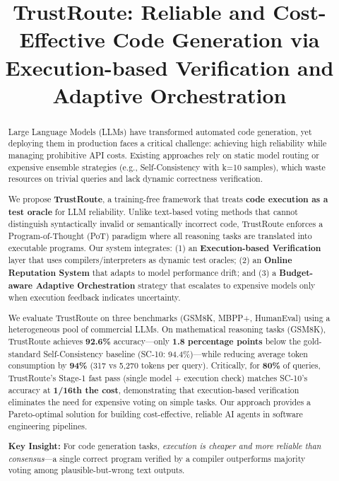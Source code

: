 \documentclass[acmsmall,screen,review,anonymous]{acmart}
\begin{document}
\title{TrustRoute: Reliable and Cost-Effective Code Generation via Execution-based Verification and Adaptive Orchestration}

\begin{abstract}
Large Language Models (LLMs) have transformed automated code generation, yet deploying them in production faces a critical challenge: achieving high reliability while managing prohibitive API costs. Existing approaches rely on static model routing or expensive ensemble strategies (e.g., Self-Consistency with k=10 samples), which waste resources on trivial queries and lack dynamic correctness verification.

We propose \textbf{TrustRoute}, a training-free framework that treats \textbf{code execution as a test oracle} for LLM reliability. Unlike text-based voting methods that cannot distinguish syntactically invalid or semantically incorrect code, TrustRoute enforces a Program-of-Thought (PoT) paradigm where all reasoning tasks are translated into executable programs. Our system integrates: (1) an \textbf{Execution-based Verification} layer that uses compilers/interpreters as dynamic test oracles; (2) an \textbf{Online Reputation System} that adapts to model performance drift; and (3) a \textbf{Budget-aware Adaptive Orchestration} strategy that escalates to expensive models only when execution feedback indicates uncertainty.

We evaluate TrustRoute on three benchmarks (GSM8K, MBPP+, HumanEval) using a heterogeneous pool of commercial LLMs. On mathematical reasoning tasks (GSM8K), TrustRoute achieves \textbf{92.6\%} accuracy—only \textbf{1.8 percentage points} below the gold-standard Self-Consistency baseline (SC-10: 94.4\%)—while reducing average token consumption by \textbf{94\%} (317 vs 5,270 tokens per query). Critically, for \textbf{80\%} of queries, TrustRoute's Stage-1 fast pass (single model + execution check) matches SC-10's accuracy at \textbf{1/16th the cost}, demonstrating that execution-based verification eliminates the need for expensive voting on simple tasks. Our approach provides a Pareto-optimal solution for building cost-effective, reliable AI agents in software engineering pipelines.

\textbf{Key Insight:} For code generation tasks, \textit{execution is cheaper and more reliable than consensus}—a single correct program verified by a compiler outperforms majority voting among plausible-but-wrong text outputs.
\end{abstract}
\end{document}
